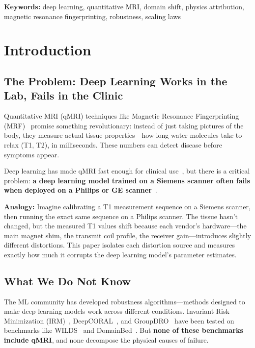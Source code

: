 \documentclass[11pt,a4paper]{article}
\begin{document}
\textbf{Keywords:} deep learning, quantitative MRI, domain shift,
physics attribution, magnetic resonance fingerprinting, robustness,
scaling laws


\section{Introduction}
\label{sec:intro}

\subsection{The Problem: Deep Learning Works in the Lab, Fails in the Clinic}

Quantitative MRI (qMRI) techniques like Magnetic Resonance
Fingerprinting (MRF)~\cite{ma2013magnetic} promise something
revolutionary: instead of just taking pictures of the body, they
measure actual tissue properties---how long water molecules take to
relax (T1, T2), in milliseconds. These numbers can detect disease
before symptoms appear.

Deep learning has made qMRI fast enough for clinical
use~\cite{hamilton2021deep}, but there is a critical problem:
\textbf{a deep learning model trained on a Siemens scanner often fails
when deployed on a Philips or GE
scanner}~\cite{full2020studying,kushol2023dsmri}.

\begin{mdframed}[style=insightbox]
\textbf{Analogy:} Imagine calibrating a T1 measurement sequence on a
Siemens scanner, then running the exact same sequence on a Philips
scanner. The tissue hasn't changed, but the measured T1 values shift
because each vendor's hardware---the main magnet shim, the transmit
coil profile, the receiver gain---introduces slightly different
distortions. This paper isolates each distortion source and measures
exactly how much it corrupts the deep learning model's parameter
estimates.
\end{mdframed}

\subsection{What We Do Not Know}

The ML community has developed robustness algorithms---methods designed
to make deep learning models work across different conditions. Invariant
Risk Minimization (IRM)~\cite{arjovsky2019invariant},
DeepCORAL~\cite{sun2016deep}, and
GroupDRO~\cite{sagawa2020distributionally} have been tested on
benchmarks like WILDS~\cite{koh2021wilds} and
DomainBed~\cite{gulrajani2021search}. But \textbf{none of these
benchmarks include qMRI}, and none decompose the physical causes of
failure.
\end{document}
